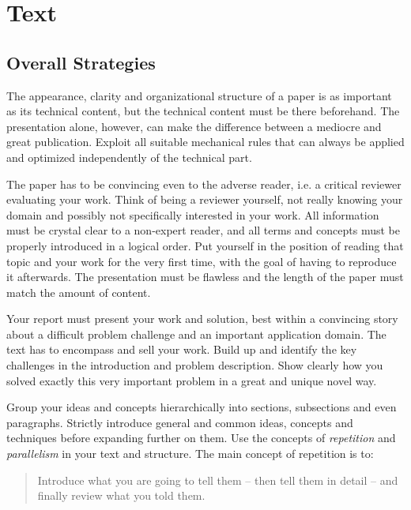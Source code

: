 \documentclass[11pt, a4paper,oneside,chapterprefix=false]{scrbook}
\begin{document}
\section*{Text} \label{sec:text}

\subsection*{Overall Strategies}

The appearance, clarity and organizational structure of a paper is as important as its technical content, but the technical content must be there beforehand. The presentation alone, however, can make the difference between a mediocre and great publication. Exploit all suitable mechanical rules that can always be applied and optimized independently of the technical part.

The paper has to be convincing even to the adverse reader, i.e. a critical reviewer evaluating your work. Think of being a reviewer yourself, not really knowing your domain and possibly not specifically interested in your work. All information must be crystal clear to a non-expert reader, and all terms and concepts must be properly introduced in a logical order. Put yourself in the position of reading that topic and your work for the very first time, with the goal of having to reproduce it afterwards. The presentation must be flawless and the length of the paper must match the amount of content.

Your report must present your work and solution, best within a convincing story about a difficult problem challenge and an important application domain. The text has to encompass and sell your work. Build up and identify the key challenges in the introduction and problem description. Show clearly how you solved exactly this very important problem in a great and unique novel way.

Group your ideas and concepts hierarchically into sections, subsections and even paragraphs. Strictly introduce general and common ideas, concepts and techniques before expanding further on them. Use the concepts of \emph{repetition} and \emph{parallelism} in your text and structure. The main concept of repetition is to:

\begin{quotation}
Introduce what you are going to tell them -- then tell them in detail -- and finally review what you told them.
\end{quotation}
\end{document}
